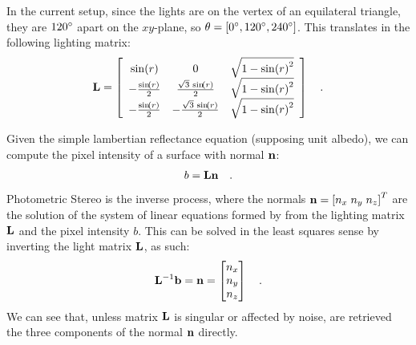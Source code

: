 \documentclass{report}
\begin{document}
In the current setup, since the lights are on the vertex of an equilateral triangle, they are $120\degree$ apart on the $xy$-plane, so $\theta = \left[ 0\degree, 120\degree, 240\degree \right]$. This translates in the following lighting matrix:
\begin{equation}
\B{L} =
\left[\begin{array}{ccc} \sin\!\left(r\right) & 0 & \sqrt{1 - {\sin\!\left(r\right)}^2}\\ -\frac{\sin\!\left(r\right)}{2} & \frac{\sqrt{3}\, \sin\!\left(r\right)}{2} & \sqrt{1 - {\sin\!\left(r\right)}^2}\\ -\frac{\sin\!\left(r\right)}{2} & -\frac{\sqrt{3}\, \sin\!\left(r\right)}{2} & \sqrt{1 - {\sin\!\left(r\right)}^2} \end{array}\right]
\quad .
\end{equation}

Given the simple lambertian reflectance equation (supposing unit albedo), we can compute the pixel intensity of a surface with normal $\mathbf{n}$:
\begin{equation}
b = \mathbf{L}\mathbf{n}
\quad.
\end{equation}
Photometric Stereo is the inverse process, where the normals $\mathbf{n} = \left[ n_x \; n_y \; n_z\right]^T$ are the solution of the system of linear equations formed by from the lighting matrix $\mathbf{L}$ and the pixel intensity $b$. This can be solved in the least squares sense by inverting the light matrix $\mathbf{L}$, as such:
\begin{equation}
\mathbf{L}^{-1}\mathbf{b} = \mathbf{n} = 
\begin{bmatrix}
n_x \\
n_y \\
n_z 
\end{bmatrix}
\quad.
\end{equation}
We can see that, unless matrix $\mathbf{L}$ is singular or affected by noise, are retrieved the three components of the normal $\mathbf{n}$ directly.
\end{document}
